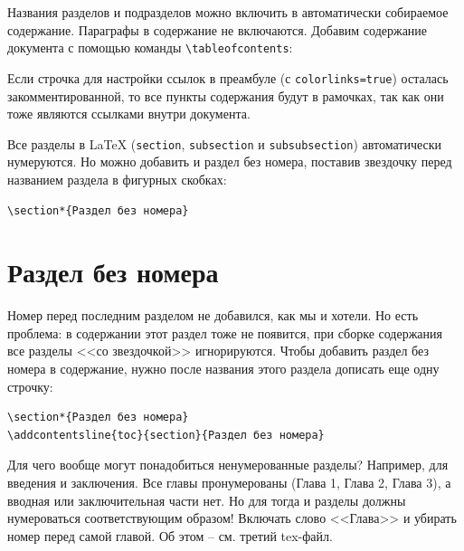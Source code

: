 \documentclass[12pt]{article}
\begin{document}
Названия разделов и подразделов можно включить в автоматически собираемое содержание. Параграфы в содержание не включаются. Добавим содержание документа с помощью команды \texttt{\textbackslash tableofcontents}:

\tableofcontents

Если строчка для настройки ссылок в преамбуле (с \texttt{colorlinks=true}) осталась закомментированной, то все пункты содержания будут в рамочках, так как они тоже являются ссылками внутри документа.

Все разделы в \LaTeX{} (\texttt{section}, \texttt{subsection} и \texttt{subsubsection}) автоматически нумеруются. Но можно добавить и раздел без номера, поставив звездочку перед названием раздела в фигурных скобках:

\begin{center}
\begin{BVerbatim}
\section*{Раздел без номера} 
\end{BVerbatim}
\end{center}

\section*{Раздел без номера}

Номер перед последним разделом не добавился, как мы и хотели. Но есть проблема: в содержании этот раздел тоже не появится, при сборке содержания все разделы <<со звездочкой>> игнорируются. Чтобы добавить раздел без номера в содержание, нужно после названия этого раздела дописать еще одну строчку:

\begin{center}
\begin{BVerbatim}
\section*{Раздел без номера} 
\addcontentsline{toc}{section}{Раздел без номера}
\end{BVerbatim}
\end{center}

Для чего вообще могут понадобиться ненумерованные разделы? Например, для введения и заключения. Все главы пронумерованы (Глава 1, Глава 2, Глава 3), а вводная или заключительная части нет. Но для тогда и разделы должны нумероваться соответствующим образом! Включать слово <<Глава>> и убирать номер перед самой главой. Об этом -- см. третий tex-файл.
 
\end{document}
